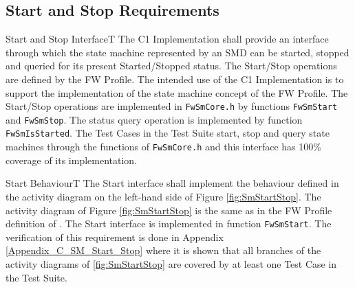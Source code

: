 \documentclass[requirements]{../fwprofile}
\begin{document}
\subsection{Start and Stop Requirements}\label{req:startStopInterface}

\begin{fw_req}{Start and Stop Interface}{T}
{ The C1 Implementation shall provide an interface through 
which the state machine represented by an SMD can be started, 
stopped and queried for its present Started/Stopped status.}
{The Start/Stop operations are defined by the FW Profile. 
The intended use of the C1 Implementation is to support 
the implementation of the state machine concept of the FW Profile.}
{The Start/Stop operations are implemented in \texttt{FwSmCore.h}
 by functions \texttt{FwSmStart} and \texttt{FwSmStop}. 
The status query operation is implemented by function \texttt{FwSmIsStarted}.} 
{The Test Cases in the Test Suite start, stop and query state machines 
through the functions of \texttt{FwSmCore.h} and this interface has 100\% coverage of its implementation.}
\end{fw_req}


\begin{fw_req}{Start Behaviour}{T}
{The Start interface shall implement the behaviour defined in the activity diagram on the left-hand side of 
Figure \ref{fig:SmStartStop}.}
{The activity diagram of Figure \ref{fig:SmStartStop} is the same as in the FW Profile definition of \cite{ref:fwprofile}.}
{The Start interface is implemented in function \texttt{FwSmStart}.} 
{The verification of this requirement is done in Appendix
\ref{Appendix_C_SM_Start_Stop} where it is shown that all branches of the activity diagrams of
\ref{fig:SmStartStop} are covered by at least one Test Case in the Test Suite.}
\end{fw_req}
\end{document}
